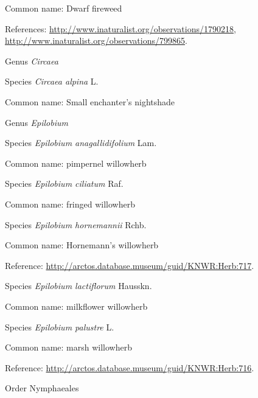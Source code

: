 \documentclass[9pt, article]{memoir}
\begin{document}
\begin{multicols}{2}
Common name: Dwarf fireweed

References: 
\url{http://www.inaturalist.org/observations/1790218}, 
\url{http://www.inaturalist.org/observations/799865}.

\vspace{6pt}\noindent\hspace{30pt}Genus \textit{Circaea}


\vspace{6pt}\noindent\hspace{36pt}Species \textit{Circaea alpina} L.


Common name: Small enchanter's nightshade

\vspace{6pt}\noindent\hspace{30pt}Genus \textit{Epilobium}


\vspace{6pt}\noindent\hspace{36pt}Species \textit{Epilobium anagallidifolium} Lam.


Common name: pimpernel willowherb

\vspace{6pt}\noindent\hspace{36pt}Species \textit{Epilobium ciliatum} Raf.


Common name: fringed willowherb

\vspace{6pt}\noindent\hspace{36pt}Species \textit{Epilobium hornemannii} Rchb.


Common name: Hornemann's willowherb

Reference: 
\url{http://arctos.database.museum/guid/KNWR:Herb:717}.

\vspace{6pt}\noindent\hspace{36pt}Species \textit{Epilobium lactiflorum} Hausskn.


Common name: milkflower willowherb

\vspace{6pt}\noindent\hspace{36pt}Species \textit{Epilobium palustre} L.


Common name: marsh willowherb

Reference: 
\url{http://arctos.database.museum/guid/KNWR:Herb:716}.

\vspace{6pt}\noindent\hspace{18pt}Order Nymphaeales



\end{multicols}
\end{document}
